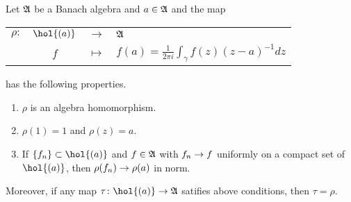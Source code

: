 \begin{thm}
	Let $\mathfrak{A}$ be a Banach algebra and $a \in \mathfrak{A}$ and the map
	\begin{center}
		\begin{tabular}{l c c l}
			$\rho \colon$ & $\hol{(a)}$ & $\longrightarrow$ & $\mathfrak{A}$ \\
			~ & $f$ & $\longmapsto$ & $f(a)=\frac{1}{2 \pi i}\int_{\gamma} f(z) (z-a)^{-1} dz$
		\end{tabular}
	\end{center}
	has the following properties.
	\begin{enumerate}[label=\arabic*)]
		\item $\rho$ is an algebra homomorphism.
		\item $\rho(1) = 1$ and $\rho(z)=a$.
		\item If $\{f_n\} \subset \hol{(a)}$ and $f \in \mathfrak{A}$ with $f_n \rightarrow f$ uniformly on a compact set of $\hol{(a)}$, then $\rho(f_n) \rightarrow \rho(a)$ in norm.
	\end{enumerate}
	Moreover, if any map $\tau \colon \hol{(a)} \sto \alg{A}$ satifies above conditions, then $\tau = \rho$. 
\end{thm}
